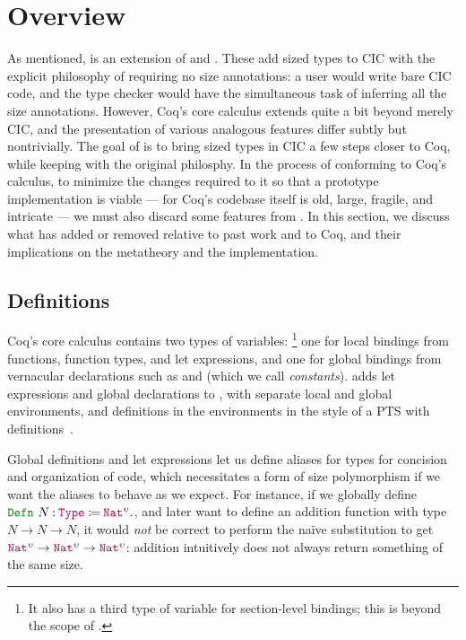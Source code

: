 \section{Overview}\label{sec:overview} %

As mentioned, \lang is an extension of \CIChat and \CIChatminus.
These add sized types to CIC with the explicit philosophy of requiring no size annotations:
a user would write bare CIC code, and the type checker would have the simultaneous task of inferring all the size annotations.
However, Coq's core calculus extends quite a bit beyond merely CIC,
and the presentation of various analogous features differ subtly but nontrivially.
The goal of \lang is to bring sized types in CIC a few steps closer to Coq,
while keeping with the original philosphy.
In the process of conforming to Coq's calculus, to minimize the changes required to it so that a prototype implementation is viable --- for Coq's codebase itself is old, large, fragile, and intricate --- we must also discard some features from \CIChatminus.
In this section, we discuss what \lang has added or removed relative to past work and to Coq,
and their implications on the metatheory and the implementation.

\subsection{Definitions}

Coq's core calculus contains two types of variables:%
\footnote{It also has a third type of variable for section-level bindings;
this is beyond the scope of \lang.}
one for local bindings from functions, function types, and let expressions,
and one for global bindings from vernacular declarations such as  and  (which we call \textit{constants}).
\lang adds let expressions and global declarations to \CIChatminus,
with separate local and global environments,
and definitions in the environments in the style of a PTS with definitions~\citep{ptsdef}.

Global definitions and let expressions let us define aliases for types for concision and organization of code,
which necessitates a form of size polymorphism if we want the aliases to behave as we expect.
For instance, if we globally define $\Defn{N}{\Type{}}{\Nat^\upsilon}$,
and later want to define an addition function with type $N \rightarrow N \rightarrow N$,
it would \emph{not} be correct to perform the na\"ive substitution to get $\Nat^\upsilon \rightarrow \Nat^\upsilon \rightarrow \Nat^\upsilon$:
addition intuitively does not always return something of the same size.

